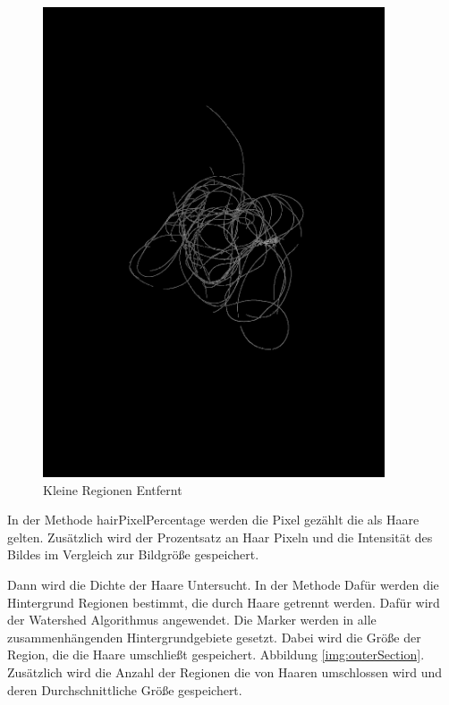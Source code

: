 \documentclass[german,a4paper,12pt]{llncs}
\begin{document}
\begin{figure}
	\centering
	\includegraphics[width=0.9\textwidth]{fig64/06small regions removed.png}
	\caption[]{Kleine Regionen Entfernt}
	\label{img:smallRegions}
\end{figure}

In der Methode hairPixelPercentage werden die Pixel gezählt die als Haare gelten. Zusätzlich wird der Prozentsatz an Haar Pixeln und die Intensität des Bildes im Vergleich zur Bildgröße gespeichert. 

Dann wird die Dichte der Haare Untersucht. In der Methode 
Dafür werden die Hintergrund Regionen bestimmt, die durch Haare getrennt werden. Dafür wird der Watershed Algorithmus angewendet.
Die Marker werden in alle zusammenhängenden Hintergrundgebiete gesetzt.
Dabei wird die Größe der Region, die die Haare umschließt gespeichert. Abbildung \ref{img:outerSection}.
Zusätzlich wird die Anzahl der Regionen die von Haaren umschlossen wird und deren Durchschnittliche Größe gespeichert.
\end{document}
